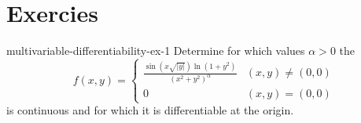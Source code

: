 \documentclass[preview]{standalone}
\begin{document}
\genpage

\section{Exercies}

\begin{snippetexercise}{multivariable-differentiability-ex-1}{}
    Determine for which values \(\alpha > 0\) the \function
    \[
        f(x,y) = \begin{cases}
            \frac{\sin\left(x\sqrt{|y|}\right) \ln(1 + y^2)}{{(x^2 + y^2)}^\alpha} & (x,y) \neq (0,0) \\
            0 & (x,y) = (0,0)
        \end{cases}
    \]
    is continuous and for which it is differentiable at the origin.
\end{snippetexercise}
\end{document}
